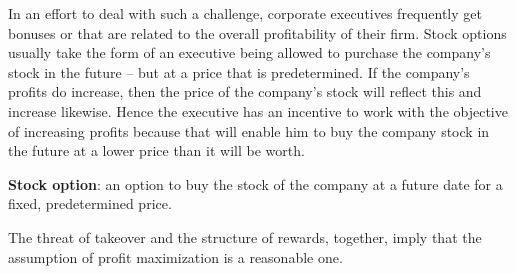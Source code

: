 \newhtmlpage

In an effort to deal with such a challenge, corporate executives frequently
get bonuses or  that are related to the overall
profitability of their firm. Stock options usually take the form of an
executive being allowed to purchase the company's stock in the future -- but
at a price that is predetermined. If the company's profits do increase, then
the price of the company's stock will reflect this and increase likewise.
Hence the executive has an incentive to work with the objective of
increasing profits because that will enable him to buy the company stock in
the future at a lower price than it will be worth.

\begin{DefBox}
\textbf{Stock option}: an option to buy the stock of the company at a future date for a fixed, predetermined price.
\end{DefBox}

The threat of takeover and the structure of rewards, together, imply that
the assumption of profit maximization is a reasonable one.

\newhtmlpage

